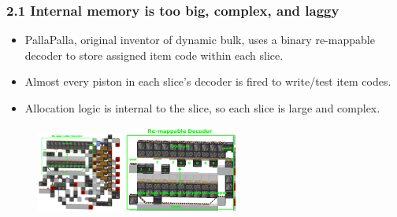 \documentclass[aspectratio=169]{beamer}
\begin{document}
\begin{frame}
	\frametitle{2.1 Internal memory is too big, complex, and laggy}

    \begin{itemize}
		\item PallaPalla, original inventor of dynamic bulk, uses a binary re-mappable decoder to store assigned item code within each slice.
		\item Almost every piston in each slice's decoder is fired to write/test item codes.
		\item Allocation logic is internal to the slice, so each slice is large and complex.
	\end{itemize}

    \begin{figure}
        \includegraphics[width=0.25\textwidth]{pallaslice2lbl.png}
        \includegraphics[width=0.33\textwidth]{pallaslice2lblzoom.png}
    \end{figure}

\end{frame}
\end{document}
